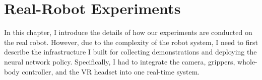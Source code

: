 \chapter{Real-Robot Experiments}

In this chapter, I introduce the details of how our experiments are conducted on the real robot. 
However, due to the complexity of the robot system, I need to first describe the infrastructure I built for collecting demonstrations and deploying the neural network policy. Specifically, I had to integrate the camera, grippers, whole-body controller, and the VR headset into one real-time system.
